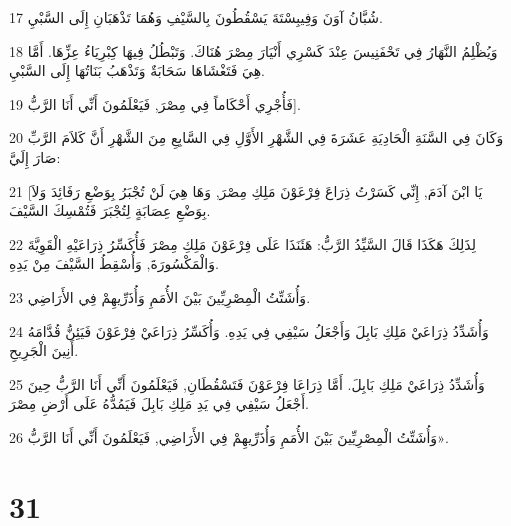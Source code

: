 \par 17 شُبَّانُ آوَنَ وَفِيبِسْتَةَ يَسْقُطُونَ بِالسَّيْفِ وَهُمَا تَذْهَبَانِ إِلَى السَّبْيِ.
\par 18 وَيُظْلِمُ النَّهَارُ فِي تَحْفَنِيسَ عِنْدَ كَسْرِي أَنْيَارَ مِصْرَ هُنَاكَ. وَتَبْطُلُ فِيهَا كِبْرِيَاءُ عِزِّهَا. أَمَّا هِيَ فَتَغْشَاهَا سَحَابَةٌ وَتَذْهَبُ بَنَاتُهَا إِلَى السَّبْيِ.
\par 19 فَأُجْرِي أَحْكَاماً فِي مِصْرَ, فَيَعْلَمُونَ أَنِّي أَنَا الرَّبُّ].
\par 20 وَكَانَ فِي السَّنَةِ الْحَادِيَةِ عَشَرَةَ فِي الشَّهْرِ الأَوَّلِ فِي السَّابِعِ مِنَ الشَّهْرِ أَنَّ كَلاَمَ الرَّبِّ صَارَ إِلَيَّ:
\par 21 [يَا ابْنَ آدَمَ, إِنِّي كَسَرْتُ ذِرَاعَ فِرْعَوْنَ مَلِكِ مِصْرَ, وَهَا هِيَ لَنْ تُجْبَرُ بِوَضْعِ رَفَائِدَ وَلاَ بِوَضْعِ عِصَابَةٍ لِتُجْبَرَ فَتُمْسِكَ السَّيْفَ.
\par 22 لِذَلِكَ هَكَذَا قَالَ السَّيِّدُ الرَّبُّ: هَئَنَذَا عَلَى فِرْعَوْنَ مَلِكِ مِصْرَ فَأُكَسِّرُ ذِرَاعَيْهِ الْقَوِيَّةَ وَالْمَكْسُورَةَ, وَأُسْقِطُ السَّيْفَ مِنْ يَدِهِ.
\par 23 وَأُشَتِّتُ الْمِصْرِيِّينَ بَيْنَ الأُمَمِ وَأُذَرِّيهِمْ فِي الأَرَاضِي.
\par 24 وَأُشَدِّدُ ذِرَاعَيْ مَلِكِ بَابِلَ وَأَجْعَلُ سَيْفِي فِي يَدِهِ. وَأُكَسِّرُ ذِرَاعَيْ فِرْعَوْنَ فَيَئِنُّ قُدَّامَهُ أَنِينَ الْجَرِيحِ.
\par 25 وَأُشَدِّدُ ذِرَاعَيْ مَلِكِ بَابِلَ. أَمَّا ذِرَاعَا فِرْعَوْنَ فَتَسْقُطَانِ, فَيَعْلَمُونَ أَنِّي أَنَا الرَّبُّ حِينَ أَجْعَلُ سَيْفِي فِي يَدِ مَلِكِ بَابِلَ فَيَمُدُّهُ عَلَى أَرْضِ مِصْرَ.
\par 26 وَأُشَتِّتُ الْمِصْرِيِّينَ بَيْنَ الأُمَمِ وَأُذَرِّيهِمْ فِي الأَرَاضِي, فَيَعْلَمُونَ أَنِّي أَنَا الرَّبُّ».

\chapter{31}

